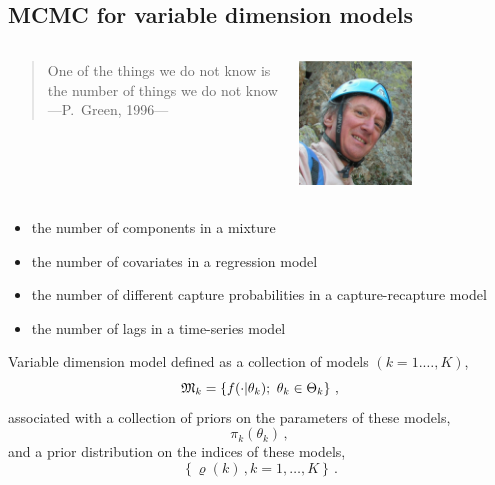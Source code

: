 \begin{slide}
\end{slide}\subsection{MCMC for variable dimension models}\begin{slide}

\begin{columns}
\small\begin{flushleft}
\begin{quote}
One of the things we do not know is\\
the number of things we do not know\\
---P.~Green, 1996---
\end{quote}
\end{flushleft}\normalsize
{}
\begin{flushright}\includegraphics[width=3cm]{figures/peterG.eps}\end{flushright}
\end{columns}

\pause
\begin{example} \begin{itemize}
\item the number of components in a mixture
\item the number of covariates in a regression model
\item the number of different capture probabilities in a capture-recapture model
\item the number of lags in a time-series model
\end{itemize} \end{example}

\end{slide}\begin{slide}

Variable dimension model defined as a collection of models $(k=1.\ldots,K)$,
$$
   \GoM_k = \left\{ f(\cdot|\theta_k);\ \theta_k\in\Theta_k \right\}\,,
$$
associated with a collection of priors on the parameters of these models,
$$
  \pi_k(\theta_k)\,,
$$
and a prior distribution on the indices of these models,
$$
\left\{ \varrho(k)\,,k=1,\ldots,K \right\} \,.
$$


\end{slide}

